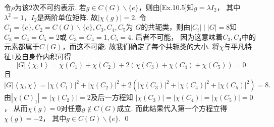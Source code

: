 \begin{enumerate}
        令$\rho$为该$2$次不可约表示.
        若$g \in C(G)\backslash\{e\}$，则由[Ex.10.5]知$g=\lambda I_{2}$，
        其中$\lambda^{2}=1$，$I_{2}$是两阶单位矩阵.
        故$|\chi(g)|=2$. 
        令$C_{1}=\{e\},C_{2}=C(G)\backslash\{e\},C_{3},C_{4},C_{5}$为
        $G$的共轭类，则由$|C_{i}| \mid |G|=8$知$C_{3}=C_{4}=C_{5}=2$或
        $C_{3}=C_{4}=1,C_{5}=4$. 后者不可能，
        因为这意味着$C_{3},C_{4}$中的元素都属于$C(G)$，而这不可能.
        故我们确定了每个共轭类的大小. 将$\chi$与平凡特征$1$及自身作内积可得
        \[|G|\left<\chi,1\right> = \chi(C_{1}) + \chi(C_{2}) 
        + 2(\chi(C_{3}) + \chi(C_{4}) + \chi(C_{5})) = 0\]
        且
        \[|G|\left<\chi,\chi\right> = |\chi(C_{1})|^{2} 
        + |\chi(C_{2})|^{2} + 2(|\chi(C_{3})|^{2} 
        + |\chi(C_{4})|^{2} + |\chi(C_{5})|^{2}) = 8.\]
        由$|\chi(C)_{1}|=|\chi(C_{2})|=2$及后一方程知
        $|\chi(C_{3})|=|\chi(C_{4})|=|\chi(C_{5})|=0$，
        从而$\chi(g)=0$对任意$g \notin C(G)$成立.
        而此结果代入第一个方程立得$\chi(g)=-2$，
        其中$g \in C(G) \backslash \{e\}$. \qed


\end{enumerate}
